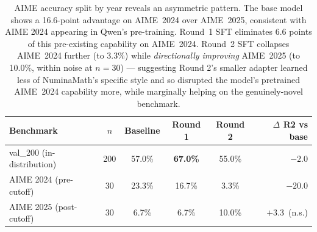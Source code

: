 \begin{table}[t]
\centering
\caption{AIME accuracy split by year reveals an asymmetric pattern. The base model shows a 16.6-point advantage on AIME~2024 over AIME~2025, consistent with AIME 2024 appearing in Qwen's pre-training. Round~1 SFT eliminates 6.6 points of this pre-existing capability on AIME~2024. Round~2 SFT collapses AIME~2024 further (to 3.3\%) while \textit{directionally improving} AIME~2025 (to 10.0\%, within noise at $n{=}30$) — suggesting Round 2's smaller adapter learned less of NuminaMath's specific style and so disrupted the model's pretrained AIME~2024 capability more, while marginally helping on the genuinely-novel benchmark.}
\label{tab:robustness}
\begin{tabular}{lccccr}
\toprule
\textbf{Benchmark} & $n$ & \textbf{Baseline} & \textbf{Round 1} & \textbf{Round 2} & \textbf{$\Delta$ R2 vs base} \\
\midrule
val\_200 (in-distribution) & 200 & 57.0\% & \textbf{67.0\%} & 55.0\% & $-2.0$ \\
\midrule
AIME 2024 (pre-cutoff)     & 30  & 23.3\% & 16.7\% & \phantom{0}3.3\% & $-20.0$ \\
AIME 2025 (post-cutoff)    & 30  & \phantom{0}6.7\% & \phantom{0}6.7\% & 10.0\% & $+3.3$~(n.s.) \\
\bottomrule
\end{tabular}
\end{table}

